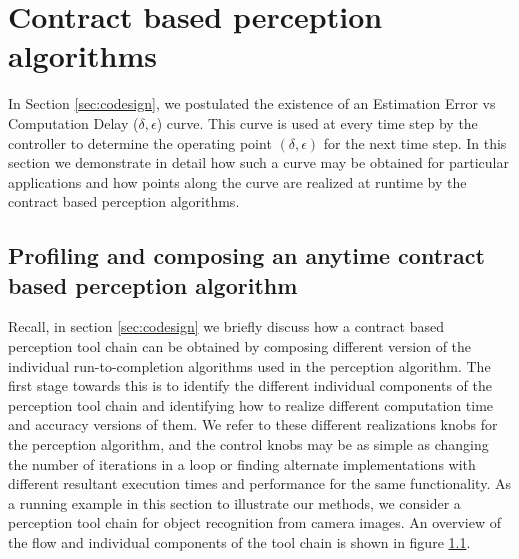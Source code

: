 \section{Contract based perception algorithms}
\label{delayErrorCurve}

In Section \ref{sec:codesign}, we postulated the existence of an Estimation Error vs Computation Delay ($\delta,\epsilon$) curve. %
This curve is used at every time step by the controller to determine the operating point $(\delta,\epsilon)$ for the next time step.
In this section we demonstrate in detail how such a curve may be obtained for particular applications and how points along the curve are realized at runtime by the contract based perception algorithms.

\subsection{Profiling and composing an anytime contract based perception algorithm}

Recall, in section \ref{sec:codesign} we briefly discuss how a contract based perception tool chain can be obtained by composing different version of the individual run-to-completion algorithms used in the perception algorithm. The first stage towards this is to identify the different individual components of the perception tool chain and identifying how to realize different computation time and accuracy versions of them. We refer to these different realizations  knobs for the perception algorithm, and the control knobs may be as simple as changing the number of iterations in a loop \cite{greenMS} or finding alternate implementations with different resultant execution times and performance for the same functionality. As a running example in this section to illustrate our methods, we consider a perception tool chain for object recognition from camera images. An overview of the flow and individual components of the tool chain is shown in figure \ref{}. 

